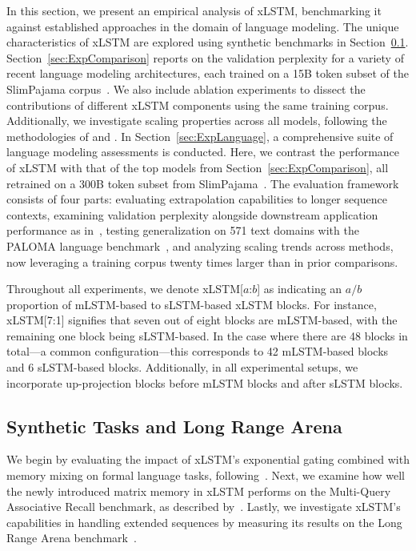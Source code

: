 In this section, we present an empirical analysis of xLSTM, benchmarking it against established approaches in the domain of language modeling. The unique characteristics of xLSTM are explored using synthetic benchmarks in Section~\ref{sec:ExpSyntethic}. Section~\ref{sec:ExpComparison} reports on the validation perplexity for a variety of recent language modeling architectures, each trained on a 15B token subset of the SlimPajama corpus~\citep{Soboleva:23}. We also include ablation experiments to dissect the contributions of different xLSTM components using the same training corpus. Additionally, we investigate scaling properties across all models, following the methodologies of \citet{Kaplan:20} and \citet{Brown:20short}. In Section~\ref{sec:ExpLanguage}, a comprehensive suite of language modeling assessments is conducted. Here, we contrast the performance of xLSTM with that of the top models from Section~\ref{sec:ExpComparison}, all retrained on a 300B token subset from SlimPajama~\citep{Soboleva:23}. The evaluation framework consists of four parts: evaluating extrapolation capabilities to longer sequence contexts, examining validation perplexity alongside downstream application performance as in~\citep{Sutawika:24}, testing generalization on 571 text domains with the PALOMA language benchmark~\citep{Magnusson:23arxivshort}, and analyzing scaling trends across methods, now leveraging a training corpus twenty times larger than in prior comparisons.

Throughout all experiments, we denote xLSTM[$a$:$b$] as indicating an $a/b$ proportion of mLSTM-based to sLSTM-based xLSTM blocks. For instance, xLSTM[7:1] signifies that seven out of eight blocks are mLSTM-based, with the remaining one block being sLSTM-based. In the case where there are 48 blocks in total—a common configuration—this corresponds to 42 mLSTM-based blocks and 6 sLSTM-based blocks. Additionally, in all experimental setups, we incorporate up-projection blocks before mLSTM blocks and after sLSTM blocks.

\subsection{Synthetic Tasks and Long Range Arena}
\label{sec:ExpSyntethic}
We begin by evaluating the impact of xLSTM's exponential gating combined with memory mixing on formal language tasks, following~\citet{Deletang:23}. Next, we examine how well the newly introduced matrix memory in xLSTM performs on the Multi-Query Associative Recall benchmark, as described by~\citet{Arora:23arxiv}. Lastly, we investigate xLSTM's capabilities in handling extended sequences by measuring its results on the Long Range Arena benchmark~\citep{Tay:21}.

